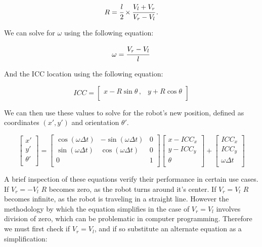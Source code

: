 \begin{equation}
	R = \cfrac{l}{2} \times \cfrac{V_l + V_r}{V_r - V_l}\,.
\end{equation}

We can solve for $\omega$ using the following equation:

\begin{equation}
	\omega = \cfrac{V_r - V_l}{l}\,
\end{equation}

And the ICC location using the following equation:

\begin{equation}
	ICC = 
	\begin{bmatrix}
	    x - R\sin\theta\,, & y + R\cos\theta \\
	\end{bmatrix}
\end{equation}

We can then use these values to solve for the robot's new position, defined as coordinates $(x',y')$ and orientation $\theta'$.

\begin{equation}
	\begin{bmatrix}
	    x'      \\
	    y'      \\
	    \theta' \\
	\end{bmatrix} =
	\begin{bmatrix}
		\cos(\omega\Delta t) & -\sin(\omega\Delta t) & 0 \\
		\sin(\omega\Delta t) & \cos(\omega\Delta t)  & 0 \\
		0                    &                       & 1 \\
	\end{bmatrix}
	\begin{bmatrix}
		x - ICC_x  \\
		y - ICC_y  \\
		\theta     \\
	\end{bmatrix} + 
	\begin{bmatrix}
		ICC_x          \\
		ICC_y          \\
		\omega\Delta t \\
	\end{bmatrix}
\end{equation}

A brief inspection of these equations verify their performance in certain use cases.  If $V_r = -V_l$ $R$ becomes zero, as the robot turns around it's center.  If $V_r = V_l$ $R$ becomes infinite, as the robot is traveling in a straight line.   However the methodology by which the equation simplifies in the case of $V_r = V_l$ involves division of zero, which can be problematic in computer programming.   Therefore we must first check if $V_r = V_l$, and if so substitute an alternate equation as a simplification:

